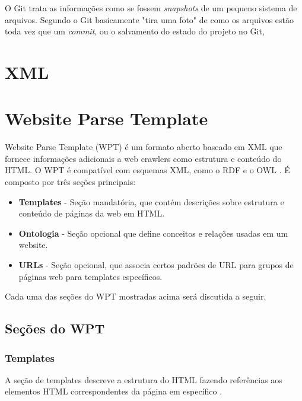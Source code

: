 O Git trata as informações como se fossem \emph{snapshots} de um pequeno sistema de arquivos. Segundo \cite[p. 6]{progit} o Git basicamente "tira uma foto" de como os arquivos estão toda vez que um \emph{commit}, ou o salvamento do estado do projeto no Git, 

\pagebreak


\section{XML}


\pagebreak


\section{Website Parse Template}


Website Parse Template (WPT) é um formato aberto baseado em XML que fornece informações adicionais a web crawlers como estrutura e conteúdo do HTML. O WPT é compatível com esquemas XML, como o RDF e o OWL \cite{wpt}. É composto por três seções principais:

\begin{itemize}
	\item \textbf{Templates} - Seção mandatória, que contém descrições sobre estrutura e conteúdo de páginas da web em HTML.
	\item \textbf{Ontologia} - Seção opcional que define conceitos e relações usadas em um website.
	\item \textbf{URLs} - Seção opcional, que associa certos padrões de URL para grupos de páginas web para templates específicos. 
\end{itemize}

Cada uma das seções do WPT mostradas acima será discutida a seguir.

\subsection{Seções do WPT}

\subsubsection{Templates}

A seção de templates descreve a estrutura do HTML fazendo referências aos elementos HTML correspondentes da página em específico \cite{wpt}.

